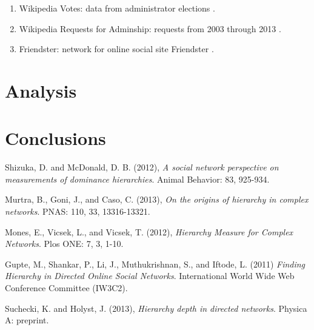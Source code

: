 \documentclass[3p,times]{elsarticle}
\begin{document}
\begin{enumerate}
\begin{enumerate}
    \item Wikipedia Votes: data from administrator elections \cite{wiki}.
    
    \item Wikipedia Requests for Adminship: requests from 2003 through 2013 \cite{wiki2}.

    \item Friendster: network for online social site Friendster \cite{friendster}.

\end{enumerate}

\section{Analysis}



\section{Conclusions}






\begin{thebibliography}{9}
	Shizuka, D. and McDonald, D. B. (2012),
	\textit{A social network perspective on measurements of dominance hierarchies}. 
	Animal Behavior: 83, 925-934.
	
	Murtra, B., Goni, J., and Caso, C. (2013),
	\textit{On the origins of hierarchy in complex networks}. 
	PNAS: 110, 33, 13316-13321.

	Mones, E., Vicsek, L., and Vicsek, T. (2012),
	\textit{Hierarchy Measure for Complex Networks}. 
	Plos ONE: 7, 3, 1-10.
	
		Gupte, M., Shankar, P., Li, J., Muthukrishnan, S., and Iftode, L. (2011)
		\textit{Finding Hierarchy in Directed Online Social Networks}. 
		International World Wide Web Conference Committee (IW3C2).
		
		Suchecki, K. and Holyst, J. (2013),
		\textit{Hierarchy depth in directed networks}. 
		Physica A: preprint.
		

\end{thebibliography}
\end{enumerate}
\end{document}
